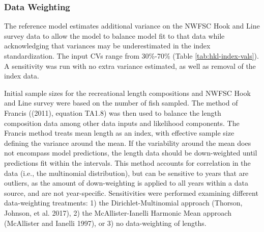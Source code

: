 \documentclass[11pt,
  english,
  a4paper,
]{article}
\begin{document}
\leavevmode\tagmcend\tagstructend\par


\hypertarget{data-weighting}{%
\subsubsection{Data Weighting}\label{data-weighting}}

\leavevmode\tagmcend\tagstructend


The reference model estimates additional variance on the NWFSC Hook and Line survey data to allow the model to balance model fit to that data while acknowledging that variances may be underestimated in the index standardization. The input CVs range from 30\%-70\% (Table \ref{tab:hkl-index-vals}). A sensitivity was run with no extra variance estimated, as well as removal of the index data.

\leavevmode\tagmcend\tagstructend\par


Initial sample sizes for the recreational length compositions and NWFSC Hook and Line survey were based on the number of fish sampled. The method of Francis ({(2011)\leavevmode\tagmcend\tagstructend}, equation TA1.8) was then used to balance the length composition data among other data inputs and likelihood components. The Francis method treats mean length as an index, with effective sample size defining the variance around the mean. If the variability around the mean does not encompass model predictions, the length data should be down-weighted until predictions fit within the intervals. This method accounts for correlation in the data (i.e., the multinomial distribution), but can be sensitive to years that are outliers, as the amount of down-weighting is applied to all years within a data source, and are not year-specific. Sensitivities were performed examining different data-weighting treatments: 1) the Dirichlet-Multinomial approach {(Thorson, Johnson, et al. 2017)\leavevmode\tagmcend\tagstructend}, 2) the McAllister-Ianelli Harmonic Mean approach {(McAllister and Ianelli 1997)\leavevmode\tagmcend\tagstructend}, or 3) no data-weighting of lengths.
\end{document}
